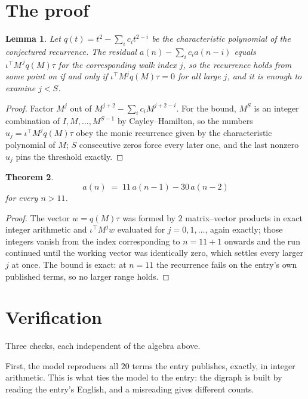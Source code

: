 \documentclass[11pt,a4paper]{article}
\theoremstyle{plain}
\newtheorem{theorem}{Theorem}
\newtheorem{lemma}[theorem]{Lemma}
\theoremstyle{definition}
\begin{document}
\section{The proof}

\begin{lemma}\label{lem:crit}
Let $q(t)=t^{2}-\sum_i c_it^{2-i}$ be the characteristic polynomial of the
conjectured recurrence. The residual $a(n)-\sum_ic_ia(n-i)$ equals
$\iota^{\!\top}M^{\,j}q(M)\tau$ for the corresponding walk index $j$, so the recurrence
holds from some point on if and only if $\iota^{\!\top}M^{j}q(M)\tau=0$ for all large $j$,
and it is enough to examine $j<S$.
\end{lemma}

\begin{proof}
Factor $M^{j}$ out of $M^{j+2}-\sum_ic_iM^{j+2-i}$. For the bound, $M^{S}$
is an integer combination of $I,M,\dots,M^{S-1}$ by Cayley--Hamilton, so the numbers
$u_j=\iota^{\!\top}M^{j}q(M)\tau$ obey the monic recurrence given by the characteristic
polynomial of $M$; $S$ consecutive zeros force every later one, and the last nonzero $u_j$
pins the threshold exactly.
\end{proof}

\begin{theorem}
\[
a(n)\;=\;11\,a(n-1) - 30\,a(n-2)
\]
for every $n>11$.
\end{theorem}

\begin{proof}
The vector $w=q(M)\tau$ was formed by $2$ matrix--vector products in exact integer
arithmetic and $\iota^{\!\top}M^{j}w$ evaluated for $j=0,1,\dots$, again exactly; those
integers vanish from the index corresponding to $n=11+1$ onwards and the run continued
until the working vector was identically zero, which settles every larger $j$ at once. The bound is exact: at $n=11$ the recurrence fails on the entry's own published terms, so no larger range holds.
\end{proof}

\section{Verification}

Three checks, each independent of the algebra above.

First, the model reproduces all $20$ terms the entry publishes, exactly, in integer
arithmetic. This is what ties the model to the entry: the digraph is built by reading the
entry's English, and a misreading gives different counts.
\end{document}
